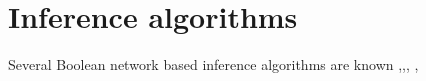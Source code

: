 \section{Inference algorithms}


Several Boolean network based inference algorithms are known
\citep{Han.2014},\citep{Zoppoli.2010},\citep{Villaverde.2014}, \citep{Kim.2007}, \citep{Faith.2007}
